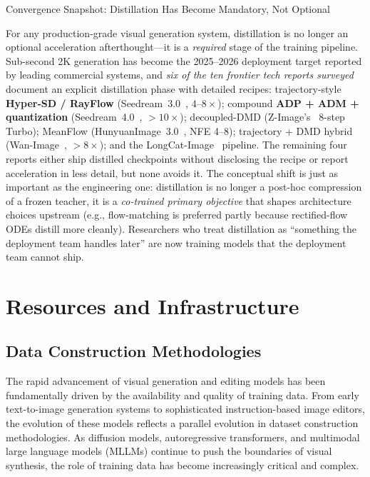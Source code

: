 \documentclass{llmxive}
\begin{document}
\begin{highlightbox}{Convergence Snapshot: Distillation Has Become Mandatory, Not Optional}

For any production-grade visual generation system, distillation is no longer an optional acceleration afterthought---it is a \emph{required} stage of the training pipeline. Sub-second 2K generation has become the 2025--2026 deployment target reported by leading commercial systems, and \emph{six of the ten frontier tech reports surveyed} document an explicit distillation phase with detailed recipes: trajectory-style \textbf{Hyper-SD / RayFlow} (Seedream~3.0~\citep{gao2025seedream}, $4$--$8\times$); compound \textbf{ADP + ADM + quantization} (Seedream~4.0~\citep{seedream2025seedream}, $>10\times$); decoupled-DMD (Z-Image's~\citep{cai2025z} 8-step Turbo); MeanFlow (HunyuanImage~3.0~\citep{cao2025hunyuanimage}, NFE 4--8); trajectory + DMD hybrid (Wan-Image~\citep{mao2026wan}, $>8\times$); and the LongCat-Image~\citep{team2025longcat} pipeline. The remaining four reports either ship distilled checkpoints without disclosing the recipe or report acceleration in less detail, but none avoids it. The conceptual shift is just as important as the engineering one: distillation is no longer a post-hoc compression of a frozen teacher, it is a \emph{co-trained primary objective} that shapes architecture choices upstream (e.g., flow-matching is preferred partly because rectified-flow ODEs distill more cleanly). Researchers who treat distillation as ``something the deployment team handles later'' are now training models that the deployment team cannot ship.
\end{highlightbox}





\section{Resources and Infrastructure}
\label{sec:resource_and_infra}








\subsection{Data Construction Methodologies}

The rapid advancement of visual generation and editing models has been fundamentally driven by the availability and quality of training data. From early text-to-image generation systems to sophisticated instruction-based image editors, the evolution of these models reflects a parallel evolution in dataset construction methodologies. As diffusion models, autoregressive transformers, and multimodal large language models (MLLMs) continue to push the boundaries of visual synthesis, the role of training data has become increasingly critical and complex.
\end{document}
